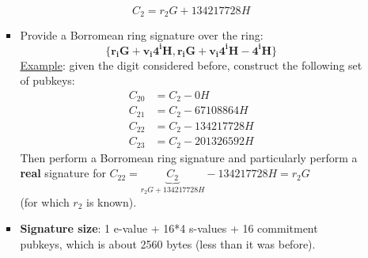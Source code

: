 \documentclass[10.5pt,compress]{beamer}
\begin{document}
\begin{frame}[allowframebreaks]
\begin{enumerate}
\begin{enumerate}
\begin{itemize}
\begin{equation*}
                    C_2 = r_2G + 134217728H
                \end{equation*}
            \framebreak
            \item Provide a Borromean ring signature over the ring:\\
            \begin{equation*}
            \{\boldsymbol{r_iG + v_i4^iH}, \boldsymbol{r_iG + v_i4^iH - 4^iH}\}
            \end{equation*}
            \underline{Example}: given the digit considered before, construct the following set of pubkeys:
            \begin{align*}
                    C_{20} &= C_2 - 0H\\ 
                    C_{21} &= C_2 - 67108864H\\
                    C_{22} &= C_2 - 134217728H\\
                    C_{23} &= C_2 - 201326592H
            \end{align*}
            Then perform a Borromean ring signature and particularly perform a \textbf{real} signature for $C_{22} = \underbrace{C_2}_{r_2G + 134217728H} - 134217728H = r_2G$\\
            (for which $r_2$ is known).
            \item \textbf{Signature size}: 1 e-value + 16*4 s-values + 16 commitment pubkeys, which is about 2560 bytes (less than it was before).
            \end{itemize}
        \end{enumerate}
    \end{enumerate}
\end{frame}
\end{document}
